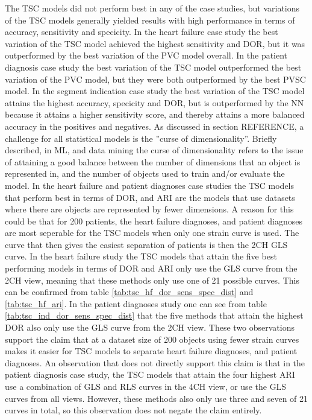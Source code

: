 The TSC models did not perform best in any of the case studies, but variations of the TSC models generally yielded results with high performance in terms of accuracy, sensitivity and specicity. In the heart failure case study the best variation of the TSC model achieved the highest sensitivity and DOR, but it was outperformed by the best variation of the PVC model overall. In the patient diagnosis case study the best variation of the TSC model outperformed the best variation of the PVC model, but they were both outperformed by the best PVSC model. In the segment indication case study the best variation of the TSC model attains the highest accuracy, specicity and DOR, but is outperformed by the NN because it attains a higher sensitivity score, and thereby attains a more balanced accuracy in the positives and negatives.
As discussed in section REFERENCE, a challenge for all statistical models is the ''curse of dimensionality''. Briefly described, in ML, and data mining the curse of dimensionality refers to the issue of attaining a good balance between the number of dimensions that an object is represented in, and the number of objects used to train and/or evaluate the model. In the heart failure and patient diagnoses case studies the TSC models that perform best in terms of DOR, and ARI are the models that use datasets where there are objects are represented by fewer dimensions. A reason for this could be that for 200 patients, the heart failure diagnoses, and patient diagnoses are most seperable for the TSC models when only one strain curve is used. The curve that then gives the easiest separation of patients is then the 2CH GLS curve. In the heart failure study the TSC models that attain the five best performing models in terms of DOR and ARI only use the GLS curve from the 2CH view, meaning that these methods only use one of 21 possible curves. This can be confirmed from table \ref{tab:tsc_hf_dor_sens_spec_dist} and \ref{tab:tsc_hf_ari}. In the patient diagnoses study one can see from table \ref{tab:tsc_ind_dor_sens_spec_dist} that the five methods that attain the highest DOR also only use the GLS curve from the 2CH view. These two observations support the claim that at a dataset size of 200 objects using fewer strain curves makes it easier for TSC models to separate heart failure diagnoses, and patient diagnoses. An observation that does not directly support this claim is that in the patient diagnosis case study, the TSC models that attain the four highest ARI use a combination of GLS and RLS curves in the 4CH view, or use the GLS curves from all views. However, these methods also only use three and seven of 21 curves in total, so this observation does not negate the claim entirely. 
